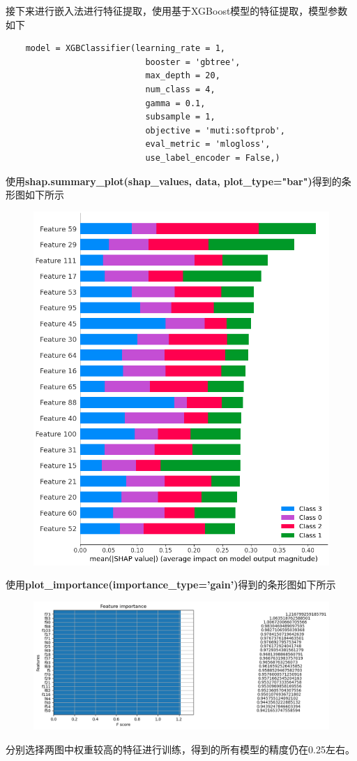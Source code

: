 \documentclass[12pt, a4paper, oneside]{ctexart}
\begin{document}
接下来进行嵌入法进行特征提取，使用基于XGBoost模型的特征提取，模型参数如下
\begin{lstlisting}
    model = XGBClassifier(learning_rate = 1,
                            booster = 'gbtree',
                            max_depth = 20,
                            num_class = 4,
                            gamma = 0.1,
                            subsample = 1,
                            objective = 'muti:softprob',
                            eval_metric = 'mlogloss',
                            use_label_encoder = False,)
\end{lstlisting}
使用\textbf{shap.summary\_plot(shap\_values, data, plot\_type="bar")}得到的条形图如下所示
\begin{figure}[H]
    \centering
    \includegraphics[scale=0.6]{5.png}
\end{figure}
使用\textbf{plot\_importance(importance\_type='gain')}得到的条形图如下所示
\begin{figure}[H]
    \centering
    \includegraphics[scale=0.6]{6.png}
\end{figure}
分别选择两图中权重较高的特征进行训练，得到的所有模型的精度仍在0.25左右。
\end{document}
